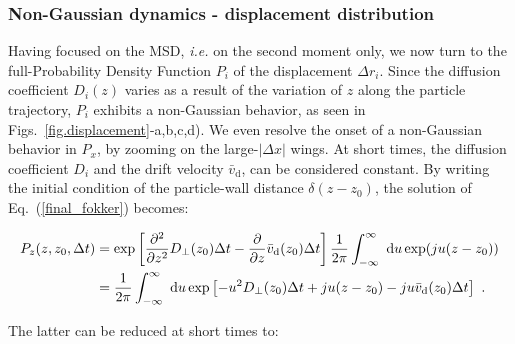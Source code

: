 \subsubsection{Non-Gaussian dynamics - displacement distribution}

Having focused on the \gls{MSD}, \textit{i.e.} on the second moment only, we now turn to the full-Probability Density Function $P_i$ of the displacement $\Delta r_i$. Since the diffusion coefficient $D_i(z)$ varies as a result of the variation of $z$ along the particle trajectory, $P_i$ exhibits a non-Gaussian behavior, as seen in Figs.~\ref{fig.displacement}-a,b,c,d). We even resolve the onset of a non-Gaussian behavior in $P_x$, by zooming on the large-$\lvert\Delta x\rvert$ wings. At short times, the diffusion coefficient $D_i$ and the drift velocity $\bar{v}_\mathrm{d}$, can be considered constant. By writing the initial condition of the particle-wall distance $\delta(z - z_0)$, the solution of Eq.~(\ref{final_fokker}) becomes:

\begin{equation}
	\begin{aligned}
		P_z(z, z_0, \Delta t) &= \exp \left[  \frac{\partial ^2}{\partial z ^2} D_\bot(z_0) \Delta t - \frac{\partial}{\partial z} \bar{v} _\mathrm{d} (z_0) \Delta t \right] \frac{1}{2 \pi} \int _{-\infty} ^{\infty} ~ \textnormal{d}u \exp (ju(z-z_0))  \\
		& = \frac{1}{2\pi} \int_{-\infty}^{\infty} ~ \textnormal{d}u \exp \left[ -u^2 D_\bot(z_0)\Delta t + ju(z-z_0) - ju  \bar{v} _\mathrm{d} (z_0) \Delta t \right] ~.
	\end{aligned}
\end{equation}

The latter can be reduced at short times to\cite{matse_state-dependent_nodate, risken_fokker-planck_2012}:


